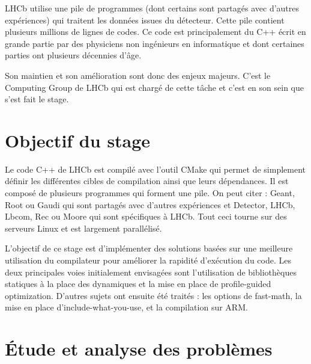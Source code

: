 \documentclass[a4paper,11pt]{report}
\begin{document}
LHCb utilise une pile de programmes (dont certains sont partagés avec d'autres expériences) qui traitent les données issues du détecteur.
Cette pile contient plusieurs millions de lignes de codes.
Ce code est principalement du C++ écrit en grande partie par des physiciens non ingénieurs en informatique et dont certaines parties ont plusieurs décennies d'âge.

Son maintien et son amélioration sont donc des enjeux majeurs.
C'est le Computing Group de LHCb qui est chargé de cette tâche et c'est en son sein que s'est fait le stage.

\section{Objectif du stage}
Le code C++ de LHCb est compilé avec l'outil CMake \cite{cmake} qui permet de simplement définir les différentes cibles de compilation ainsi que leurs dépendances.
Il est composé de plusieurs programmes qui forment une pile.
On peut citer : Geant, Root ou Gaudi qui sont partagés avec d'autres expériences et Detector, LHCb, Lbcom, Rec ou Moore qui sont spécifiques à LHCb.
Tout ceci tourne sur des serveurs Linux et est largement parallélisé.

L'objectif de ce stage est d'implémenter des solutions basées sur une meilleure utilisation du compilateur pour améliorer la rapidité d'exécution du code.
Les deux principales voies initialement envisagées sont l'utilisation de bibliothèques statiques à la place des dynamiques et la mise en place de profile-guided optimization.
D'autres sujets ont ensuite été traités : les options de fast-math, la mise en place d'include-what-you-use, et la compilation sur ARM.

\section{Étude et analyse des problèmes}
\end{document}
